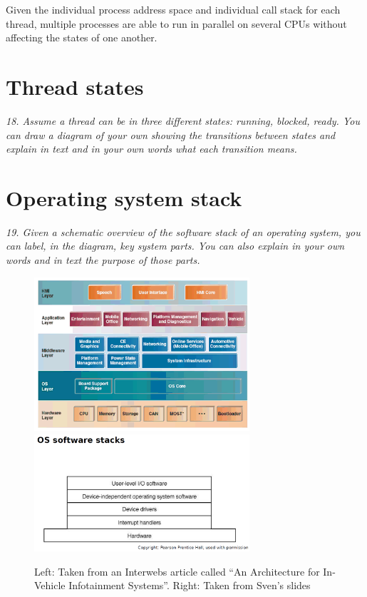 \documentclass{article}
\begin{document}
Given the individual process address space and individual call stack for each thread, multiple processes are able to run in parallel on several CPUs without affecting the states of one another.


\section{Thread states}
\emph{18. Assume a thread can be in three different states: running, blocked, ready. You can draw a diagram of your own showing the transitions between states and explain in text and in your own words what each transition means.}



\section{Operating system stack}
\emph{19. Given a schematic overview of the software stack of an operating system, you can label, in the diagram, key system parts. You can also explain in your own words and in text the purpose of those parts.}


\begin{figure}[H]
  \centering
  \includegraphics[width=8.0cm]{images/os-stack.png}
  \includegraphics[width=8.0cm]{images/os-software-stack.png}
  \caption{Left: Taken from an Interwebs article called ``An Architecture for In-Vehicle Infotainment Systems''. Right: Taken from Sven's slides}
\end{figure}
\end{document}
